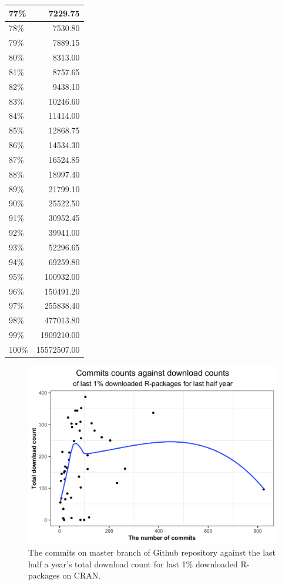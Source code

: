 \documentclass[
]{book}
\begin{document}
\begin{table}
\begin{tabular}[t]{l|r}
\hline
77\% & 7229.75\\
\hline
78\% & 7530.80\\
\hline
79\% & 7889.15\\
\hline
80\% & 8313.00\\
\hline
81\% & 8757.65\\
\hline
82\% & 9438.10\\
\hline
83\% & 10246.60\\
\hline
84\% & 11414.00\\
\hline
85\% & 12868.75\\
\hline
86\% & 14534.30\\
\hline
87\% & 16524.85\\
\hline
88\% & 18997.40\\
\hline
89\% & 21799.10\\
\hline
90\% & 25522.50\\
\hline
91\% & 30952.45\\
\hline
92\% & 39941.00\\
\hline
93\% & 52296.65\\
\hline
94\% & 69259.80\\
\hline
95\% & 100932.00\\
\hline
96\% & 150491.20\\
\hline
97\% & 255838.40\\
\hline
98\% & 477013.80\\
\hline
99\% & 1909210.00\\
\hline
100\% & 15572507.00\\
\hline
\end{tabular}
\end{table}



\begin{figure}

{\centering \includegraphics{figures/pkg-low-1} 

}

\caption{The commits on master branch of Github repository against the last half a year's total download count for last 1\% downloaded R-packages on CRAN.}\label{fig:pkg-low}
\end{figure}
\end{document}
